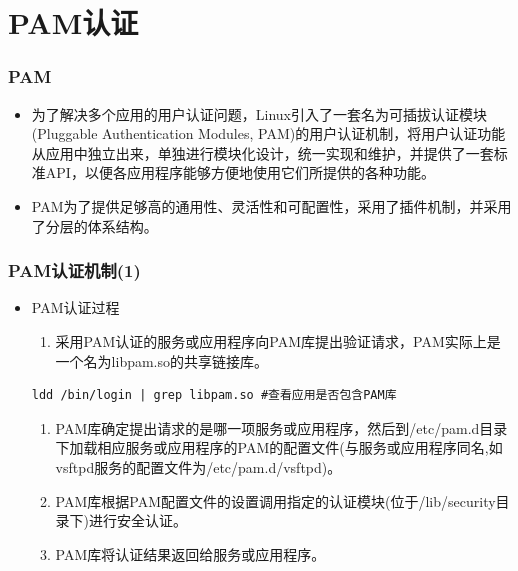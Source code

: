 \documentclass[xcolor=svgnames,presentation]{beamer}
\begin{document}
\section{PAM认证}
\label{sec-6}
\begin{frame}
\frametitle{PAM}
\label{sec-6-1}
\begin{itemize}

\item 为了解决多个应用的用户认证问题，Linux引入了一套名为可插拔认证模块(Pluggable Authentication Modules, PAM)的用户认证机制，将用户认证功能从应用中独立出来，单独进行模块化设计，统一实现和维护，并提供了一套标准API，以便各应用程序能够方便地使用它们所提供的各种功能。
\label{sec-6-1-1}%

\item PAM为了提供足够高的通用性、灵活性和可配置性，采用了插件机制，并采用了分层的体系结构。
\label{sec-6-1-2}%
\end{itemize} %
\end{frame}
\begin{frame}[fragile]
\frametitle{PAM认证机制(1)}
\label{sec-6-2}
\begin{itemize}

\item PAM认证过程
\label{sec-6-2-1}%
\begin{enumerate}
\item 采用PAM认证的服务或应用程序向PAM库提出验证请求，PAM实际上是一个名为libpam.so的共享链接库。
\end{enumerate}

\begin{verbatim}
ldd /bin/login | grep libpam.so #查看应用是否包含PAM库
\end{verbatim}
\begin{enumerate}
\item PAM库确定提出请求的是哪一项服务或应用程序，然后到/etc/pam.d目录下加载相应服务或应用程序的PAM的配置文件(与服务或应用程序同名,如vsftpd服务的配置文件为/etc/pam.d/vsftpd)。
\item PAM库根据PAM配置文件的设置调用指定的认证模块(位于/lib/security目录下)进行安全认证。
\item PAM库将认证结果返回给服务或应用程序。
\end{enumerate}
\end{itemize} %
\end{frame}
\end{document}
